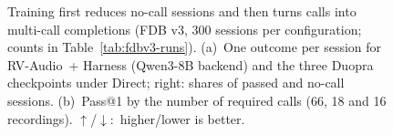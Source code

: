 \begin{figure}[tbp]
\centering
{}
\caption{Training first reduces no-call sessions and then turns calls into multi-call completions (FDB v3, 300 sessions per configuration; counts in Table~\ref{tab:fdbv3-runs}). (a)~One outcome per session for RV-Audio~+ Harness (Qwen3-8B backend) and the three Duopra checkpoints under Direct; right: shares of passed and no-call sessions. (b)~Pass@1 by the number of required calls (66, 18 and 16 recordings). $\uparrow$/$\downarrow$:~higher/lower is better.}
\label{fig:analysis}
\end{figure}
